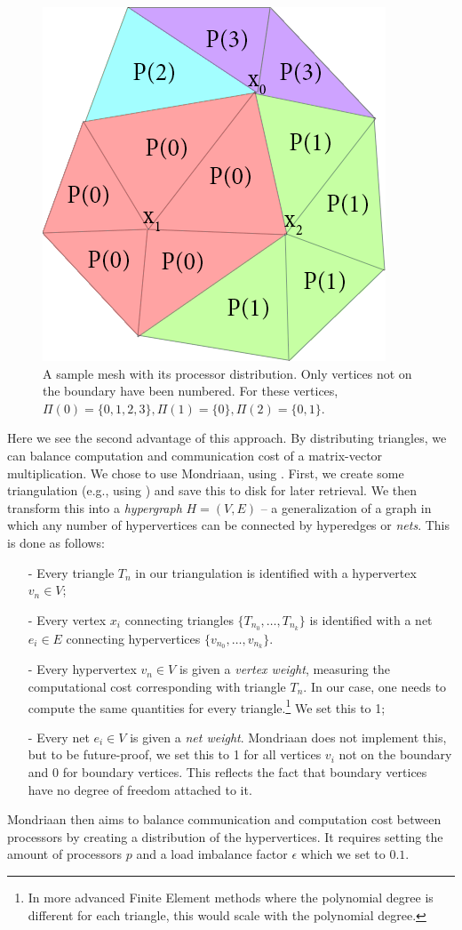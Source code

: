 \documentclass[11pt]{amsart}
\theoremstyle{definition}
\begin{document}
\begin{figure}
  \includegraphics[width=0.5\linewidth]{procset.png}
  \caption{A sample mesh with its processor distribution. Only vertices not on the boundary have been numbered. For these vertices, $\Pi(0) = \{0, 1, 2, 3\}, \Pi(1) = \{0\}, \Pi(2) = \{0, 1\}$.}
  \label{fig:procset}
\end{figure}

Here we see the second advantage of this approach. By distributing triangles, we can balance computation and communication cost of a matrix-vector multiplication. We chose to use Mondriaan, using \cite{bissmondriaan,biss2012}. First, we create some triangulation (e.g., using \cite{TODOJAN}) and save this to disk for later retrieval. We then transform this into a \emph{hypergraph} $H = (V,E)$ -- a generalization of a graph in which any number of hypervertices can be connected by hyperedges or \emph{nets}. This is done as follows:
\begin{itemize}
  \item[-] Every triangle $T_n$ in our triangulation is identified with a hypervertex $v_n \in V$;
  \item[-] Every vertex $x_i$ connecting triangles $\{T_{n_0}, \ldots, T_{n_k}\}$ is identified with a net $e_i \in E$ connecting hypervertices $\{v_{n_0}, \ldots, v_{n_k}\}$.
  \item[-] Every hypervertex $v_n \in V$ is given a \emph{vertex weight}, measuring the computational cost corresponding with triangle $T_n$. In our case, one needs to compute the same quantities for every triangle.\footnote{In more advanced Finite Element methods where the polynomial degree is different for each triangle, this would scale with the polynomial degree.} We set this to 1;
  \item[-] Every net $e_i\in V$ is given a \emph{net weight}. Mondriaan does not implement this, but to be future-proof, we set this to 1 for all vertices $v_i$ not on the boundary and 0 for boundary vertices. This reflects the fact that boundary vertices have no degree of freedom attached to it.
\end{itemize}
Mondriaan then aims to balance communication and computation cost between processors by creating a distribution of the hypervertices. It requires setting the amount of processors $p$ and a load imbalance factor $\epsilon$ which we set to $0.1$.
\end{document}

